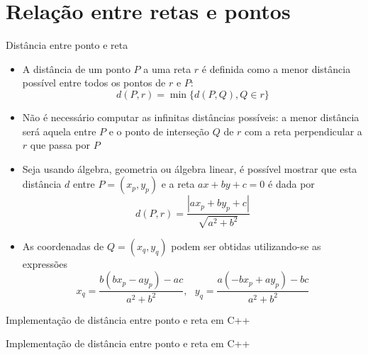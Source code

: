 \section{Relação entre retas e pontos}

\begin{frame}[fragile]{Distância entre ponto e reta}

    \begin{itemize}
        \item A distância de um ponto $P$ a uma reta $r$ é definida como a menor distância possível
            entre todos os pontos de $r$ e $P$:
        \[
            d(P, r) = \min \lbrace d(P, Q), Q\in r\rbrace
        \]
        \pause

        \item Não é necessário computar as infinitas distâncias possíveis: a menor
            distância será aquela entre $P$ e o ponto de interseção $Q$ de $r$ com a reta
            perpendicular a $r$ que passa por $P$
        \pause

        \item Seja usando álgebra, geometria ou álgebra linear, é possível mostrar que esta
            distância $d$ entre $P = (x_p, y_p)$ e a reta $ax + by + c = 0$ é dada por
        \[
            d(P, r) = \frac{|ax_p + by_p + c|}{\sqrt{a^2 + b^2}}
        \]
        \pause

        \item As coordenadas de $Q = (x_q, y_q)$ podem ser obtidas utilizando-se as expressões
        \[
            x_q = \frac{b(bx_p - ay_p) - ac}{a^2 + b^2}, \, \, \, \, y_q = \frac{a(-bx_p + ay_p) - bc}{a^2 + b^2}
        \]
    \end{itemize}

\end{frame}

\begin{frame}[fragile]{Implementação de distância entre ponto e reta em C++}
\end{frame}

\begin{frame}[fragile]{Implementação de distância entre ponto e reta em C++}
\end{frame}

